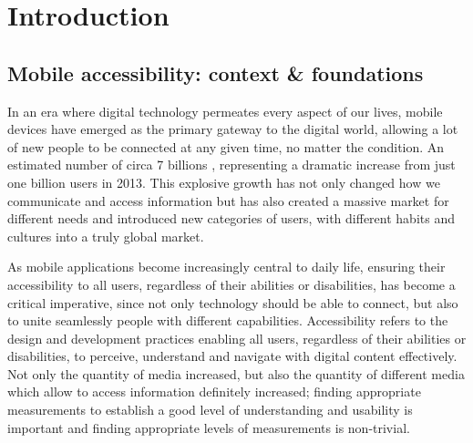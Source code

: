 \chapter{Introduction}
\label{chap:intro}

% 
% 
% 
% 
% 

\section{Mobile accessibility: context \& foundations}
\label{chap:intro-background}

In an era where digital technology permeates every aspect of our lives, mobile devices have emerged as the primary gateway to the digital world, allowing a lot of new people to be connected at any given time, no matter the condition. An estimated number of circa 7 billions \cite{article:number-of-users}, representing a dramatic increase from just one billion users in 2013. This explosive growth has not only changed how we communicate and access information but has also created a massive market for different needs and introduced new categories of users, with different habits and cultures into a truly global market.

As mobile applications become increasingly central to daily life, ensuring their accessibility to all users, regardless of their abilities or disabilities, has become a critical imperative, since not only technology should be able to connect, but also to unite seamlessly people with different capabilities. Accessibility refers to the design and development practices enabling all users, regardless of their abilities or disabilities, to perceive, understand and navigate with digital content effectively. Not only the quantity of media increased, but also the quantity of different media which allow to access information definitely increased; finding appropriate measurements to establish a good level of understanding and usability is important and finding appropriate levels of measurements is non-trivial. \\

